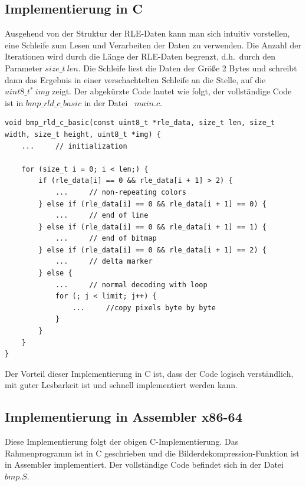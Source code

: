 \documentclass[course=erap]{aspdoc}
\begin{document}
    \subsection{Implementierung in C}\label{subsec:implementierung-in-c}
    Ausgehend von der Struktur der RLE-Daten kann man sich intuitiv vorstellen, eine Schleife zum Lesen und
    Verarbeiten der Daten zu verwenden.
    Die Anzahl der Iterationen wird durch die Länge der RLE-Daten begrenzt, d.h.\ durch den Parameter $size\_t \ len$.
    Die Schleife liest die Daten der Größe 2 Bytes und schreibt dann das Ergebnis in einer verschachtelten Schleife
    an die Stelle, auf die $uint8\_t^* \ img$ zeigt.
    \newline
    \newline
    Der abgekürzte Code lautet wie folgt, der vollständige Code ist in $bmp\_rld\_c\_basic$ in
    der Datei \ $main.c$.
    \lstset{language=C}
    \begin{lstlisting}
void bmp_rld_c_basic(const uint8_t *rle_data, size_t len, size_t width, size_t height, uint8_t *img) {
    ...     // initialization

    for (size_t i = 0; i < len;) {
        if (rle_data[i] == 0 && rle_data[i + 1] > 2) {
            ...     // non-repeating colors
        } else if (rle_data[i] == 0 && rle_data[i + 1] == 0) {
            ...     // end of line
        } else if (rle_data[i] == 0 && rle_data[i + 1] == 1) {
            ...     // end of bitmap
        } else if (rle_data[i] == 0 && rle_data[i + 1] == 2) {
            ...     // delta marker
        } else {
            ...     // normal decoding with loop
            for (; j < limit; j++) {
                ...     //copy pixels byte by byte
            }
        }
    }
}

    \end{lstlisting}
    \noindent Der Vorteil dieser Implementierung in C ist, dass der Code logisch
    verständlich, mit guter Lesbarkeit ist und schnell implementiert werden kann.

    \subsection{Implementierung in Assembler x86-64}\label{subsec:implementierung-in-assembler-x86-64}
    Diese Implementierung folgt der obigen C-Implementierung.
    Das Rahmenprogramm ist in C geschrieben und die Bilderdekompression-Funktion ist in Assembler implementiert.
    \newline
    \newline
    Der vollständige Code befindet sich in der Datei $bmp.S$.
\end{document}
